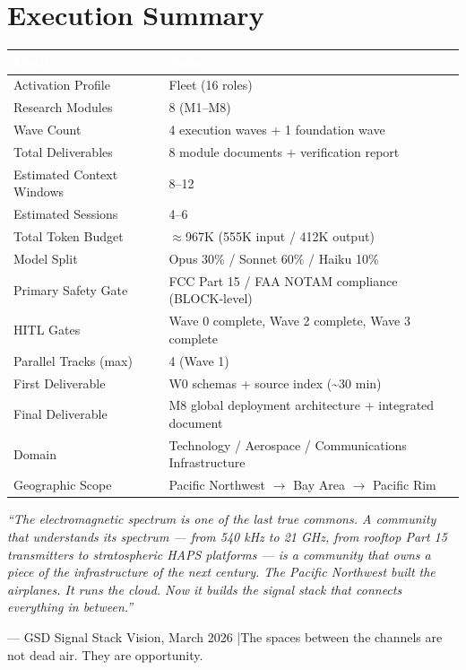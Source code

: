 \documentclass[11pt,letterpaper]{article}
\newcommand{\tableheader}[1]{\textbf{\sffamily\textcolor{white}{#1}}}
\begin{document}
\section{Execution Summary}

\begin{center}
\begin{tabularx}{\textwidth}{L{5cm}X}
\toprule
{}
\tableheader{Metric} & \tableheader{Value} \\
\midrule
Activation Profile & Fleet (16 roles) \\
Research Modules & 8 (M1--M8) \\
Wave Count & 4 execution waves + 1 foundation wave \\
Total Deliverables & 8 module documents + verification report \\
Estimated Context Windows & 8--12 \\
Estimated Sessions & 4--6 \\
Total Token Budget & $\approx$967K (555K input / 412K output) \\
Model Split & Opus 30\% / Sonnet 60\% / Haiku 10\% \\
Primary Safety Gate & FCC Part 15 / FAA NOTAM compliance (BLOCK-level) \\
HITL Gates & Wave 0 complete, Wave 2 complete, Wave 3 complete \\
Parallel Tracks (max) & 4 (Wave 1) \\
First Deliverable & W0 schemas + source index (\textasciitilde 30 min) \\
Final Deliverable & M8 global deployment architecture + integrated document \\
Domain & Technology / Aerospace / Communications Infrastructure \\
Geographic Scope & Pacific Northwest $\to$ Bay Area $\to$ Pacific Rim \\
\bottomrule
\end{tabularx}
\end{center}

\vspace{2em}

\begin{quotebox}
\textit{``The electromagnetic spectrum is one of the last true commons. A community that understands its spectrum --- from 540 kHz to 21 GHz, from rooftop Part 15 transmitters to stratospheric HAPS platforms --- is a community that owns a piece of the infrastructure of the next century. The Pacific Northwest built the airplanes. It runs the cloud. Now it builds the signal stack that connects everything in between.''}

\vspace{0.8em}
\textcolor{subtlegray}{\sffamily\small --- GSD Signal Stack Vision, March 2026 \quad|\quad The spaces between the channels are not dead air. They are opportunity.}
\end{quotebox}
\end{document}
